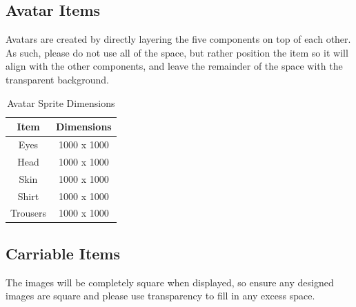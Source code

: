\documentclass[a4paper,12pt]{article}
\begin{document}
\subsection{Avatar Items}
\label{subsec:avatar_items}
Avatars are created by directly layering the five components on top of each other. As such, please do not use all of the space, but rather position the item so it will align with the other components, and leave the remainder of the space with the transparent background.

\begin{table}[H]
	\centering
	\begin{tabular}{|c|c|}
		\hline
		Item &		Dimensions \\ \hline
		Eyes &		1000 x 1000 \\
		Head &		1000 x 1000 \\
		Skin &		1000 x 1000 \\
		Shirt &		1000 x 1000 \\
		Trousers &	1000 x 1000 \\ \hline
	\end{tabular}
	\caption{Avatar Sprite Dimensions}
	\label{tab:avatar_dimensions}
\end{table}

\subsection{Carriable Items}
\label{subsec:carriable_items}

The images will be completely square when displayed, so ensure any designed images are square and please use transparency to fill in any excess space.
\end{document}
